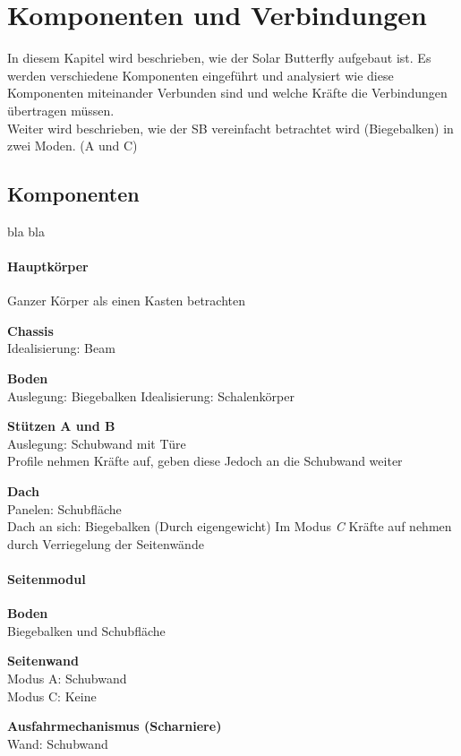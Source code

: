 \section{Komponenten und Verbindungen}
In diesem Kapitel wird beschrieben, wie der Solar Butterfly aufgebaut ist. Es werden verschiedene Komponenten eingeführt und analysiert wie diese Komponenten miteinander Verbunden sind und welche Kräfte die Verbindungen übertragen müssen.\\
Weiter wird beschrieben, wie der SB vereinfacht betrachtet wird (Biegebalken) in zwei Moden. (A und C)

\subsection{Komponenten}
bla bla

\paragraph{Hauptkörper}
Ganzer Körper als einen Kasten betrachten
\begin{description}
  \item \textbf{Chassis}\\
  Idealisierung: Beam
  \item \textbf{Boden}\\
  Auslegung: Biegebalken
  Idealisierung: Schalenkörper\\
  \item \textbf{Stützen A und B}\\
  Auslegung: Schubwand mit Türe\\
  Profile nehmen Kräfte auf, geben diese Jedoch an die Schubwand weiter\\
  \item \textbf{Dach}\\
  Panelen: Schubfläche\\
  Dach an sich: Biegebalken (Durch eigengewicht)
  Im Modus \emph{C} Kräfte auf nehmen durch Verriegelung der Seitenwände\\
  \item \textbf{}
\end{description}

\paragraph{Seitenmodul}
\begin{description}
  \item \textbf{Boden}\\
  Biegebalken und Schubfläche
  \item \textbf{Seitenwand}\\
  Modus A: Schubwand\\
  Modus C: Keine
  \item \textbf{Ausfahrmechanismus (Scharniere)}\\
  Wand: Schubwand
  \item \textbf{}\\
  \item \textbf{}\\
\end{description}
